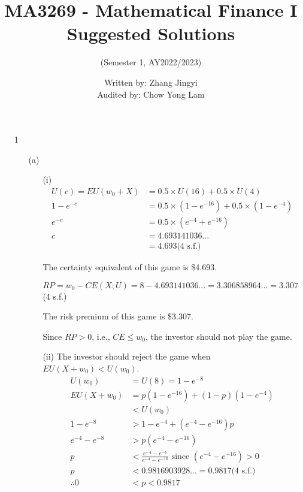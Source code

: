 \documentclass{article}
\title{MA3269 - Mathematical Finance I Suggested Solutions}
\author{(Semester 1, AY2022/2023)}
\date{Written by: Zhang Jingyi\\Audited by: Chow Yong Lam}
\begin{document}
\maketitle

\begin{enumerate}
\item[1] 
\begin{itemize}
\item[(a)] 
\begin{itemize}
\item[(i)]
\begin{align*}
U(c)=EU(w_0+X) &= 0.5 \times U(16) + 0.5 \times U(4) \\
1-e^{-c} &= 0.5 \times (1-e^{-16}) + 0.5 \times (1-e^{-4}) \\
e^{-c} &= 0.5 \times (e^{-4}+e^{-16}) \\
c &=4.693141036... \\
&=4.693 \text{(4 s.f.)}
\end{align*}

The certainty equivalent of this game is \$4.693.

$RP=w_0-CE(X;U)=8-4.693141036...=3.306858964...=3.307$ (4 s.f.)

The risk premium of this game is \$3.307.

Since $RP > 0$, i.e., $CE \leq w_0$, the investor should not play the game.\\

\item[(ii)]
The investor should reject the game when $EU(X+w_0)<U(w_0)$.
\begin{align*}
U(w_0) &= U(8)=1-e^{-8} \\
EU(X+w_0) &= p(1-e^{-16})+(1-p)(1-e^{-4}) \\
&< U(w_0) \\
1-e^{-8} &> 1-e^{-4} + (e^{-4} - e^{-16})p \\
e^{-4} - e^{-8} &> p(e^{-4} - e^{-16})\\
p &< \frac{e^{-4}-e^{-8}}{e^{-4}-e^{-16}} \text{\ \ \  since } (e^{-4}-e^{-16})>0 \\
p&<0.9816903928... = 0.9817 \text{(4 s.f.)} \\
\therefore 0&<p<0.9817
\end{align*}


\end{itemize}
\end{itemize}
\end{enumerate}
\end{document}
